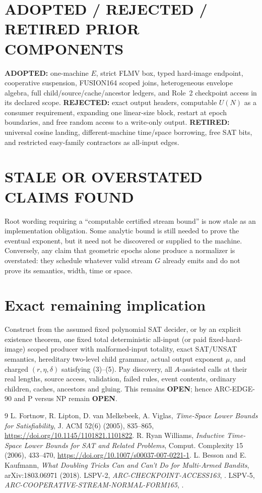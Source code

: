 \documentclass[11pt]{article}
\newcommand{\OPEN}{\textbf{OPEN}}
\begin{document}
\section{ADOPTED / REJECTED / RETIRED PRIOR COMPONENTS}
\textbf{ADOPTED:} one-machine $E$, strict FLMV box, typed hard-image endpoint,
cooperative suspension, FUSION164 scoped joins, heterogeneous envelope algebra,
full child/source/cache/ancestor ledgers, and Role~2 checkpoint access in its
declared scope.  \textbf{REJECTED:} exact output headers, computable $U(N)$ as a
consumer requirement, expanding one linear-size block, restart at epoch
boundaries, and free random access to a write-only output.  \textbf{RETIRED:}
universal cosine landing, different-machine time/space borrowing, free SAT bits,
and restricted easy-family contractors as all-input edges.

\section{STALE OR OVERSTATED CLAIMS FOUND}
Root wording requiring a ``computable certified stream bound'' is now stale as
an implementation obligation.  Some analytic bound is still needed to prove
the eventual exponent, but it need not be discovered or supplied to the
machine.  Conversely, any claim that geometric epochs alone produce a
normalizer is overstated: they schedule whatever valid stream $G$ already
emits and do not prove its semantics, width, time or space.

\section{Exact remaining implication}
Construct from the assumed fixed polynomial SAT decider, or by an explicit
existence theorem, one fixed total deterministic all-input (or paid fixed-hard-
image) scoped producer with malformed-input totality, exact SAT/UNSAT semantics,
hereditary two-level child grammar, actual output exponent $\mu$, and charged
$(r,\eta,\delta)$ satisfying (3)--(5).  Pay discovery, all $A$-assisted calls at
their real lengths, source access, validation, failed rules, event contents,
ordinary children, caches, ancestors and gluing.  This remains \OPEN; hence
ARC-EDGE-90 and P versus NP remain \OPEN.

\begin{thebibliography}{9}
 L. Fortnow, R. Lipton, D. van Melkebeek, A. Viglas,
\emph{Time-Space Lower Bounds for Satisfiability}, J. ACM 52(6) (2005),
835--865, \url{https://doi.org/10.1145/1101821.1101822}.
 R. Ryan Williams, \emph{Inductive Time-Space Lower Bounds
for SAT and Related Problems}, Comput. Complexity 15 (2006), 433--470,
\url{https://doi.org/10.1007/s00037-007-0221-1}.
 L. Besson and E. Kaufmann, \emph{What Doubling Tricks Can
and Can't Do for Multi-Armed Bandits}, arXiv:1803.06971 (2018).
 LSPV-2, \emph{ARC-CHECKPOINT-ACCESS163},
.
 LSPV-5, \emph{ARC-COOPERATIVE-STREAM-NORMAL-FORM165},
.
\end{thebibliography}
\end{document}
